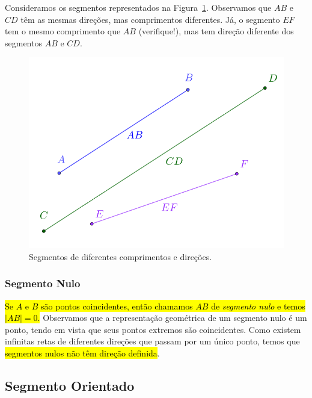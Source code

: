 \begin{ex}\label{cap_vetor_sec_segorien:ex:segmento}
  Consideramos os segmentos representados na Figura~\ref{cap_vetor_sec_segorien:fig:ex_segmento}. Observamos que $AB$ e $CD$ têm as mesmas direções, mas comprimentos diferentes. Já, o segmento $EF$ tem o mesmo comprimento que $AB$ (verifique!), mas tem direção diferente dos segmentos $AB$ e $CD$.
  
  \begin{figure}[h]
    \centering
    \includegraphics{./cap_vetor/dados/fig_ex_segmento/fig.png}
  \caption{Segmentos de diferentes comprimentos e direções.}
  \label{cap_vetor_sec_segorien:fig:ex_segmento}
\end{figure}
\end{ex}

\subsubsection{Segmento Nulo}

\hl{Se $A$ e $B$ são pontos coincidentes, então chamamos $AB$ de \emph{segmento nulo} e temos $|AB| = 0$.} Observamos que a representação geométrica de um segmento nulo é um ponto, tendo em vista que seus pontos extremos são coincidentes. Como existem infinitas retas de diferentes direções que passam por um único ponto, temos que \hl{segmentos nulos não têm direção definida}.

\subsection{Segmento Orientado}

